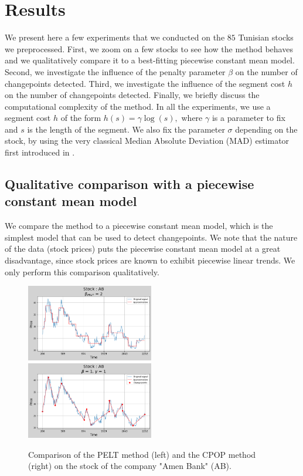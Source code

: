 \documentclass[11pt]{article}
\newcommand{\jump}{\newline\newline}
\begin{document}
\section{Results}
We present here a few experiments that we conducted on the $85$ Tunisian stocks we preprocessed. First, we zoom on a few stocks to see how the method behaves and we qualitatively compare it to a best-fitting piecewise constant mean model. Second, we investigate the influence of the penalty parameter $\beta$ on the number of changepoints detected. Third, we investigate the influence of the segment cost $h$ on the number of changepoints detected. Finally, we briefly discuss the computational complexity of the method.
\jump
In all the experiments, we use a segment cost $h$ of the form $ h(s) = \gamma \log(s), $ where $\gamma$ is a parameter to fix and $s$ is the length of the segment. We also fix the parameter $\sigma$ depending on the stock, by using the very classical Median Absolute Deviation (MAD) estimator first introduced in \cite{hampel1974}.
\subsection{Qualitative comparison with a piecewise constant mean model}
We compare the method to a piecewise constant mean model, which is the simplest model that can be used to detect changepoints. We note that the nature of the data (stock prices) puts the piecewise constant mean model at a great disadvantage, since stock prices are known to exhibit piecewise linear trends. We only perform this comparison qualitatively.
\begin{figure}[h]
    \centering
    \includegraphics[width=0.495\textwidth]{figures/comparaison CPOP PELT/PELT.png}
    \includegraphics[width=0.495\textwidth]{figures/comparaison CPOP PELT/CPOP.png}
    \caption{Comparison of the PELT method (left) and the CPOP method (right) on the stock of the company "Amen Bank" (AB).}
    \label{fig:comparison}
\end{figure}
\end{document}
